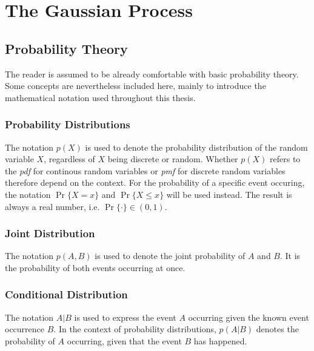 \chapter{The Gaussian Process}\label{chap:theory}

\section{Probability Theory}
The reader is assumed to be already comfortable with basic probability theory. Some concepts are nevertheless included here, mainly to introduce the mathematical notation used throughout this thesis. 

\subsection{Probability Distributions}
The notation $p(X)$ is used to denote the probability distribution of the random variable $X$, regardless of $X$ being discrete or random. Whether $p(X)$ refers to the \textit{\acrfull{pdf}} for continous random variables or \textit{\acrfull{pmf}} for discrete random variables therefore depend on the context. For the probability of a specific event occuring, the notation $\Pr\{X=x\}$ and $\Pr\{X \leq x\}$ will be used instead. The result is always a real number, i.e. $\Pr\{\cdot\} \in (0, 1)$. 

\subsection{Joint Distribution}
The notation $p(A, B)$ is used to denote the joint probability of $A$ and $B$. It is the probability of both events occurring at once.
\subsection{Conditional Distribution}
The notation $A | B$ is used to express the event $A$ occurring given the known event occurrence $B$. In the context of probability distributions, $p(A | B)$ denotes the probability of $A$ occurring, given that the event $B$ has happened.


